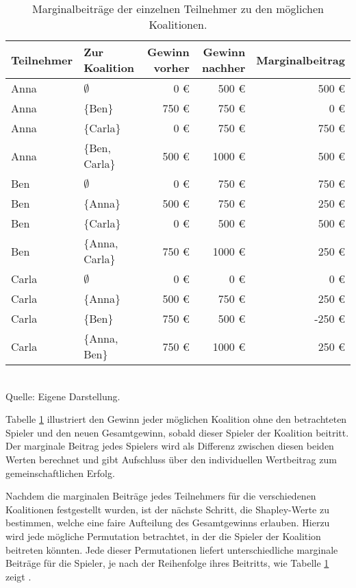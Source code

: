 \begin{table}[!h]
  \caption{Marginalbeiträge der einzelnen Teilnehmer zu den möglichen Koalitionen.}
  \footnotesize
  \begin{tabularx}{\textwidth}{XXrrr}
  \toprule
  Teilnehmer & Zur Koalition & Gewinn vorher & Gewinn nachher & Marginalbeitrag \\
  \midrule
  Anna & $\emptyset$ & 0 \euro & 500 \euro & 500 \euro \\
  Anna & $\{$Ben$\}$ & 750 \euro & 750 \euro & 0 \euro \\
  Anna & $\{$Carla$\}$ & 0 \euro & 750 \euro & 750 \euro \\
  Anna & $\{$Ben, Carla$\}$ & 500 \euro & 1000 \euro & 500 \euro\\
  Ben & $\emptyset$ & 0 \euro & 750 \euro & 750 \euro \\
  Ben & $\{$Anna$\}$ & 500 \euro & 750 \euro & 250 \euro\\
  Ben & $\{$Carla$\}$ & 0 \euro & 500 \euro & 500 \euro\\
  Ben & $\{$Anna, Carla$\}$ & 750 \euro &  1000 \euro & 250 \euro\\
  Carla & $\emptyset$ & 0 \euro & 0 \euro & 0 \euro \\
  Carla & $\{$Anna$\}$ & 500 \euro & 750 \euro & 250 \euro \\
  Carla & $\{$Ben$\}$ & 750 \euro & 500 \euro & -250 \euro \\
  Carla & $\{$Anna, Ben$\}$ & 750 \euro & 1000 \euro & 250 \euro \\
  \bottomrule
  \end{tabularx}
  \label{tab:shapley_marginal}
  \normalsize\\
  Quelle: Eigene Darstellung.
\end{table}

Tabelle \ref{tab:shapley_marginal} illustriert den Gewinn jeder möglichen Koalition ohne den 
betrachteten Spieler und den neuen Gesamtgewinn, sobald dieser Spieler der Koalition beitritt. 
Der marginale Beitrag jedes Spielers wird als Differenz zwischen diesen beiden Werten 
berechnet und gibt Aufschluss über den individuellen Wertbeitrag zum gemeinschaftlichen Erfolg.

Nachdem die marginalen Beiträge jedes Teilnehmers für die verschiedenen Koalitionen festgestellt wurden, 
ist der nächste Schritt, die Shapley-Werte zu bestimmen, welche eine faire Aufteilung des Gesamtgewinns 
erlauben. Hierzu wird jede mögliche Permutation betrachtet, in der die Spieler der 
Koalition beitreten könnten. Jede dieser Permutationen liefert unterschiedliche marginale Beiträge 
für die Spieler, je nach der Reihenfolge ihres Beitritts, wie Tabelle \ref{tab:shapley_marginal} zeigt \cite[S. 19]{Molnar_2023}.


